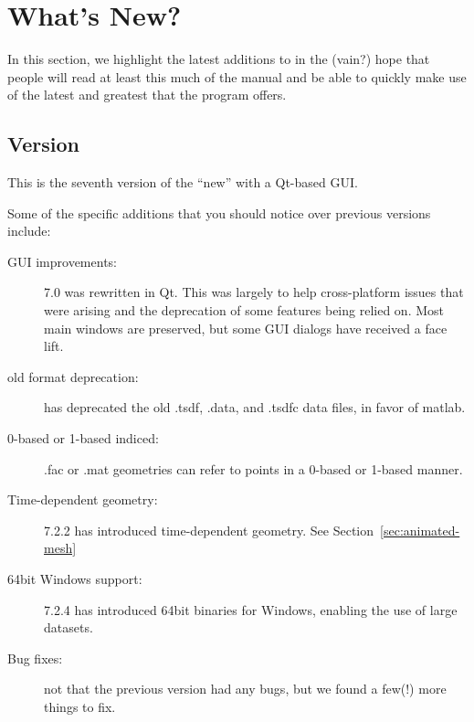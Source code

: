 \section{What's New?}
\label{sec:new-features} 

In this section, we highlight the latest additions to \map{} in the
(vain?) hope that people will read at least this much of the manual
and be able to quickly make use of the latest and greatest that the program
offers.

\subsection{Version~\version{}}

This is the seventh version of the ``new'' \map{} with a Qt-based GUI.

Some of the specific additions that you should notice over previous versions
include:
%
\begin{description}
  \item [GUI improvements: ] \map{} 7.0 was rewritten in Qt.
    This was largely to help cross-platform issues that were
    arising and the deprecation of some features being relied
    on.
    Most main windows are preserved, but some GUI dialogs have
    received a face lift.
  \item [old format deprecation: ] \map{} has deprecated the old .tsdf, .data, and .tsdfc data files, in favor of matlab.
  \item [0-based or 1-based indiced: ] .fac or .mat geometries can refer to points in a 0-based or 1-based manner.
  \item [Time-dependent geometry: ] \map{} 7.2.2 has introduced time-dependent geometry.  See Section~\ref{sec:animated-mesh}
  \item [64bit Windows support: ] \map{} 7.2.4 has introduced 64bit binaries for Windows, enabling the use of large datasets.
  \item [Bug fixes: ] not that the previous version had any bugs, but we
    found a few(!) more things to fix.
\end{description}

